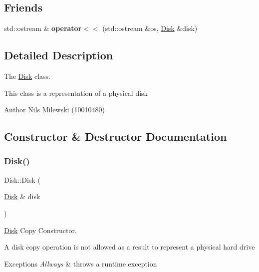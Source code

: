 \subsection*{Friends}
\begin{DoxyCompactItemize}
\item 
\mbox{\label{classdisk_1_1_disk_ab1a95b006b3b89b708da1cd417d1d96d}} 
std\+::ostream \& {\bfseries operator$<$$<$} (std\+::ostream \&os, \mbox{\hyperlink{classdisk_1_1_disk}{Disk}} \&disk)
\end{DoxyCompactItemize}


\subsection{Detailed Description}
The \mbox{\hyperlink{classdisk_1_1_disk}{Disk}} class. 

This class is a representation of a physical disk \begin{DoxyAuthor}{Author}
Nils Milewski (10010480) 
\end{DoxyAuthor}


\subsection{Constructor \& Destructor Documentation}
\mbox{\label{classdisk_1_1_disk_ad1fec93b14401a2496053fee61ec093e}} 
\subsubsection{\texorpdfstring{Disk()}{Disk()}\hspace{0.1cm}{\footnotesize\ttfamily [1/4]}}
{\footnotesize\ttfamily Disk\+::\+Disk (\begin{DoxyParamCaption}\item[{\mbox{\hyperlink{classdisk_1_1_disk}{Disk}} \&}]{disk }\end{DoxyParamCaption})\hspace{0.3cm}{\ttfamily [private]}}



\mbox{\hyperlink{classdisk_1_1_disk}{Disk}} Copy Constructor. 

A disk copy operation is not allowed as a result to represent a physical hard drive 
\begin{DoxyExceptions}{Exceptions}
{\em Allways} & throws a runtime exception \\
\hline
\end{DoxyExceptions}
\mbox{\label{classdisk_1_1_disk_a2c193c2ef0c575fe9ffa77eb2f7cf5ef}} 
